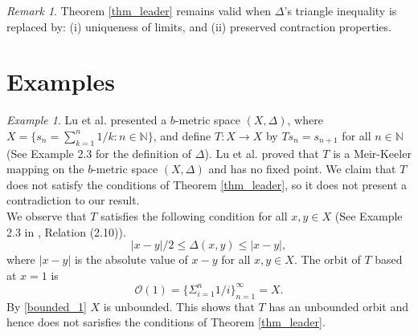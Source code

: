 \documentclass{birkjour}
\theoremstyle{definition}
\theoremstyle{remark}
\newtheorem{rem}[thm]{Remark}
\newtheorem{ex}{Example}
\numberwithin{equation}{section}
\begin{document}
\begin{rem}
Theorem \ref{thm_leader} remains valid when $\Delta$'s triangle inequality is replaced by: (i) uniqueness of limits, and (ii) preserved contraction properties.
\end{rem}
\section{Examples}\label{exams}
\begin{ex}\label{lu-exm} 
Lu et al. presented a $b$-metric space $(X,\Delta)$,  where $X=\{s_n=\sum_{k=1}^n 1/k : n\in\mathbb{N}\}$, and  define $T: X\to X$ by $Ts_n = s_{n+1}$ for all $n\in\mathbb{N}$ (See Example 2.3 \cite{lu2023question} for the definition of $\Delta$). Lu et al. proved that $T$ is a Meir-Keeler mapping on the $b$-metric space $(X,\Delta)$ and has no fixed point. We claim that $T$ does not satisfy the conditions of Theorem \ref{thm_leader}, so it does not present a contradiction to our result.\\
 We observe that $T$ satisfies the following condition for all $x,y\in X$ (See Example 2.3 in \cite{lu2023question}, Relation (2.10)).
\begin{equation}\label{bounded_1}
 |x-y|/2 \leq \Delta(x,y) \leq |x-y|,
\end{equation}
where $| x-y|$ is the absolute value of $x-y$ for all $x,y\in X$.  The orbit of $T$ based at $x=1$ is 
\[
\mathcal{O}(1)=\{\Sigma_{i = 1}^{n}{1/i} \}_{n=1}^{\infty}= X. 
\]
By \eqref{bounded_1} $X$ is unbounded. This shows that $T$ has an unbounded orbit and hence does not sarisfies the conditions of Theorem \ref{thm_leader}.
\end{ex}
\end{document}
